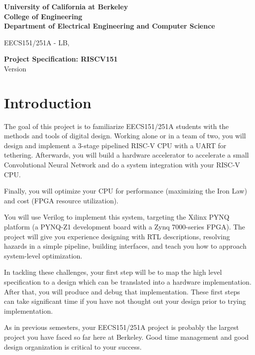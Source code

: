 \documentclass[11pt]{article}
\begin{document}
\begin{center}
{\bf
University of California at Berkeley \\
College of Engineering \\
Department of Electrical Engineering and Computer Science \\
}
\end{center}

\begin{center}
EECS151/251A - LB, \currentSemester
\end{center}

\begin{center}
\LARGE
{\bf Project Specification: RISCV151 }  \\
Version \projectSpecVersion
\end{center}

\tableofcontents

\newpage

\section{Introduction}
The goal of this project is to familiarize EECS151/251A students with the methods and tools of digital design.
Working alone or in a team of two, you will design and implement a 3-stage pipelined RISC-V CPU with a UART for tethering.
Afterwards, you will build a hardware accelerator to accelerate a small Convolutional Neural Network and do a system integration with your RISC-V CPU.

Finally, you will optimize your CPU for performance (maximizing the Iron Law) and cost (FPGA resource utilization).

You will use Verilog to implement this system, targeting the Xilinx PYNQ platform (a PYNQ-Z1 development board with a Zynq 7000-series FPGA).
The project will give you experience designing with RTL descriptions, resolving hazards in a simple pipeline, building interfaces, and teach you how to approach system-level optimization.

In tackling these challenges, your first step will be to map the high level specification to a design which can be translated into a hardware implementation.
After that, you will produce and debug that implementation.
These first steps can take significant time if you have not thought out your design prior to trying implementation.

As in previous semesters, your EECS151/251A project is probably the largest project you have faced so far here at Berkeley.
Good time management and good design organization is critical to your success.
\end{document}
